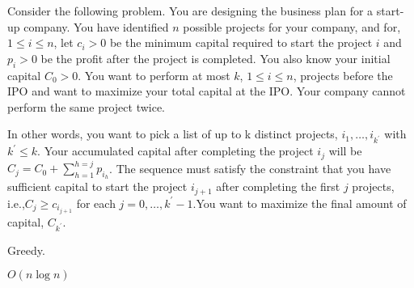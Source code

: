 \newpage
{} %

\problemdes

Consider the following problem. You are designing the business plan for a start-up company. You have identified $n$ possible projects for your company, and for, $1 \leq i \leq n$, let $c_i > 0$ be the minimum capital required to start the project $i$ and $p_i > 0$ be the profit after the project is completed. You also know your initial capital $C_0 > 0$. You want to perform at most $k$, $1 \leq i \leq n$, projects before the IPO and want to maximize your total capital at the IPO. Your company cannot perform the same project twice.

In other words, you want to pick a list of up to k distinct projects, $i_{1}, \ldots, i_{k^{\prime}}$ with $k^{\prime} \leq k$. Your accumulated capital after completing the project $i_j$ will be $C_{j}=C_{0}+\sum_{h=1}^{h=j} p_{i_{h}}$. The sequence must satisfy the constraint that you have sufficient capital to start the project $i_{j+1}$ after completing the first $j$ projects, i.e.,$C_j \geq c_{i_{j+1}}$ for each $j=0, \dots, k^{\prime}-1$.You want to maximize the final amount of capital, $C_{k^{\prime}}$.

\solution


Greedy.









$O(n\log n)$




